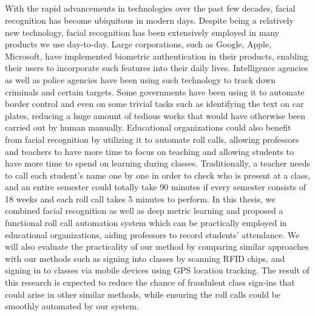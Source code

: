 \begin{center}
  \section*{\abstractname}
\end{center}
\large

With the rapid advancements in technologies over the past few decades, facial recognition has become
ubiquitous in modern days. Despite being a relatively new technology, facial recognition has been
extensively employed in many products we use day-to-day. Large corporations, such as Google, Apple, Microsoft, 
have implemented biometric authentication in their products, enabling their users to incorporate
such features into their daily lives. Intelligence agencies as well as police agencies have been using
such technology to track down criminals and certain targets. Some governments have been using it to automate
border control and even on some trivial tasks such as identifying the text on car plates, reducing a huge amount
of tedious works that would have otherwise been carried out by human manually. Educational organizations
could also benefit from facial recognition by utilizing it to automate roll calls, allowing professors and teachers
to have more time to focus on teaching and allowing students to have more time to spend on learning during classes.
Traditionally, a teacher needs to call each student's name one by one in order to check who is present at a class,
and an entire semester could totally take 90 minutes if every semester consists of 18 weeks and each roll call takes
5 minutes to perform. In this thesis, we combined facial recognition as well as deep metric learning and proposed
a functional roll call automation system which can be practically employed in educational organizations, 
aiding professors to record students' attendance. We will also evaluate the practicality of our method by comparing
similar approaches with our methods such as signing into classes by scanning RFID chips, and signing in to classes
via mobile devices using GPS location tracking. The result of this research is expected to reduce the chance of
fraudulent class sign-ins that could arise in other similar methods, while ensuring the roll calls
could be smoothly automated by our system.
\newpage
